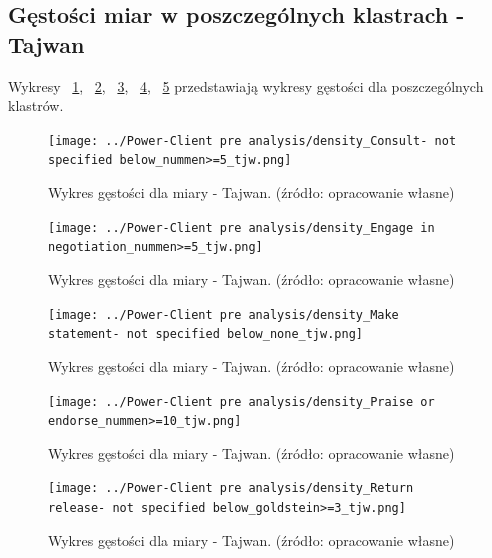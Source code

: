 \documentclass[11pt]{report}
\begin{document}
    \subsection{Gęstości miar w poszczególnych klastrach - Tajwan}\label{subsec:gęstośc-miar-w-poszczególnych-klastrach---tajwan}

    Wykresy
    ~\ref{fig:density_Consult- not specified below_nummen>=5_tjw},
    ~\ref{fig:density_Engage in negotiation_nummen>=5_tjw},
    ~\ref{fig:density_Make statement- not specified below_none_tjw},
    ~\ref{fig:density_Praise or endorse_nummen>=10_tjw},
    ~\ref{fig:density_Return release- not specified below_goldstein>=3_tjw}
    przedstawiają wykresy gęstości dla poszczególnych klastrów.

    \begin{figure}[!htp]
        \centering
        \texttt{[image: ../Power-Client pre analysis/density\_Consult- not specified below\_nummen>=5\_tjw.png]}
        \caption{Wykres gęstości dla miary - Tajwan. (źródło: opracowanie własne)}
        \label{fig:density_Consult- not specified below_nummen>=5_tjw}
    \end{figure}
    \begin{figure}[!htp]
        \centering
        \texttt{[image: ../Power-Client pre analysis/density\_Engage in negotiation\_nummen>=5\_tjw.png]}
        \caption{Wykres gęstości dla miary - Tajwan. (źródło: opracowanie własne)}
        \label{fig:density_Engage in negotiation_nummen>=5_tjw}
    \end{figure}
    \begin{figure}[!htp]
        \centering
        \texttt{[image: ../Power-Client pre analysis/density\_Make statement- not specified below\_none\_tjw.png]}
        \caption{Wykres gęstości dla miary - Tajwan. (źródło: opracowanie własne)}
        \label{fig:density_Make statement- not specified below_none_tjw}
    \end{figure}
    \begin{figure}[!htp]
        \centering
        \texttt{[image: ../Power-Client pre analysis/density\_Praise or endorse\_nummen>=10\_tjw.png]}
        \caption{Wykres gęstości dla miary - Tajwan. (źródło: opracowanie własne)}
        \label{fig:density_Praise or endorse_nummen>=10_tjw}
    \end{figure}
    \begin{figure}[!htp]
        \centering
        \texttt{[image: ../Power-Client pre analysis/density\_Return release- not specified below\_goldstein>=3\_tjw.png]}
        \caption{Wykres gęstości dla miary - Tajwan. (źródło: opracowanie własne)}
        \label{fig:density_Return release- not specified below_goldstein>=3_tjw}
    \end{figure}
\end{document}
